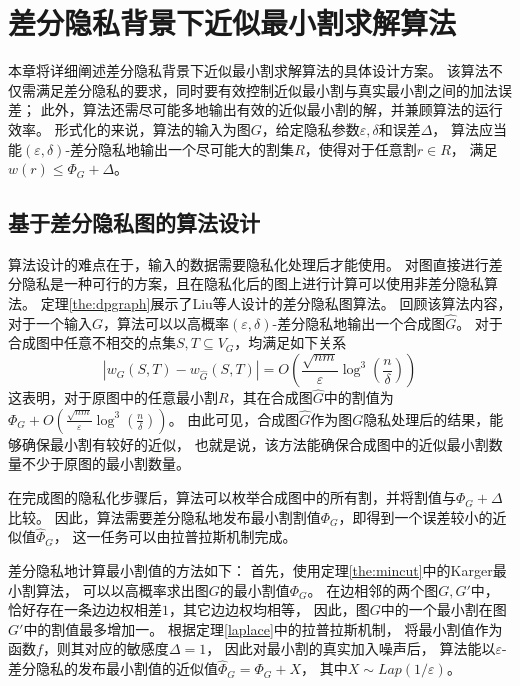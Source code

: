 \chapter{差分隐私背景下近似最小割求解算法}

本章将详细阐述差分隐私背景下近似最小割求解算法的具体设计方案。
该算法不仅需满足差分隐私的要求，同时要有效控制近似最小割与真实最小割之间的加法误差；
此外，算法还需尽可能多地输出有效的近似最小割的解，并兼顾算法的运行效率。
形式化的来说，算法的输入为图$G$，给定隐私参数$\varepsilon,\delta$和误差$\Delta$，
算法应当能$(\varepsilon,\delta)$-差分隐私地输出一个尽可能大的割集$R$，使得对于任意割$r\in R$，
满足$w(r)\leq \Phi_G+\Delta$。

\section{基于差分隐私图的算法设计}

算法设计的难点在于，输入的数据需要隐私化处理后才能使用。
对图直接进行差分隐私是一种可行的方案，且在隐私化后的图上进行计算可以使用非差分隐私算法。
定理\ref{the:dpgraph}展示了Liu等人设计的差分隐私图算法。
回顾该算法内容，
对于一个输入$G$，算法可以以高概率$(\varepsilon,\delta)$-差分隐私地输出一个合成图$\hat G$。
对于合成图中任意不相交的点集$ S, T \subseteq V_G $，均满足如下关系
    \begin{equation}
        |w_G(S, T) - w_{\hat{G}}(S, T)| = O\left(\frac{\sqrt{nm}}{\varepsilon} \log^3 \left(\frac{n}{\delta}\right)\right)   
    \end{equation}
这表明，对于原图中的任意最小割$R$，其在合成图$\hat G$中的割值为$\Phi_G+ O\left(\frac{\sqrt{nm}}{\varepsilon} \log^3 \left(\frac{n}{\delta}\right)\right)$。
由此可见，合成图$\hat G$作为图$G$隐私处理后的结果，能够确保最小割有较好的近似，
也就是说，该方法能确保合成图中的近似最小割数量不少于原图的最小割数量。

在完成图的隐私化步骤后，算法可以枚举合成图中的所有割，并将割值与$\Phi_G+\Delta$比较。
因此，算法需要差分隐私地发布最小割割值$\Phi_G$，即得到一个误差较小的近似值$\hat \Phi_G$，
这一任务可以由拉普拉斯机制完成。

差分隐私地计算最小割值的方法如下：
首先，使用定理\ref{the:mincut}中的Karger最小割算法，
可以以高概率求出图$G$的最小割值$\Phi_G$。
在边相邻的两个图$G,G'$中，恰好存在一条边边权相差$1$，其它边边权均相等，
因此，图$G$中的一个最小割在图$G'$中的割值最多增加一。
根据定理\ref{laplace}中的拉普拉斯机制，
将最小割值作为函数$f$，则其对应的敏感度$\Delta=1$，
因此对最小割的真实加入噪声后，
算法能以$\varepsilon$-差分隐私的发布最小割值的近似值$\hat \Phi_G=\Phi_G+X$，
其中$X\sim Lap(1/\varepsilon)$。

